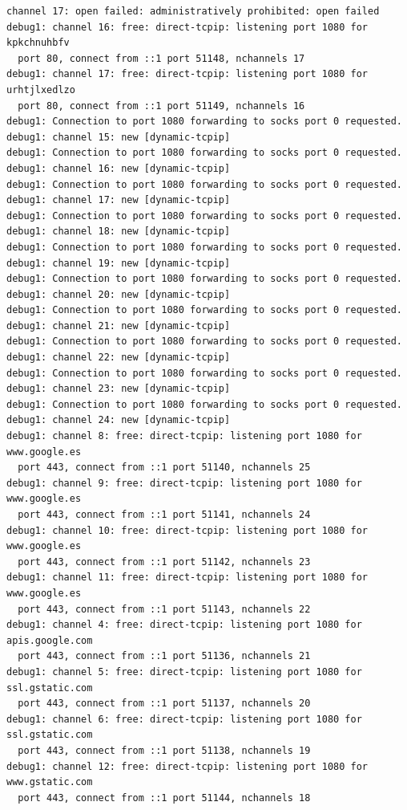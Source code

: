 \documentclass[11pt]{article}
\begin{document}
\begin{lstlisting}
channel 17: open failed: administratively prohibited: open failed
debug1: channel 16: free: direct-tcpip: listening port 1080 for kpkchnuhbfv
  port 80, connect from ::1 port 51148, nchannels 17
debug1: channel 17: free: direct-tcpip: listening port 1080 for urhtjlxedlzo
  port 80, connect from ::1 port 51149, nchannels 16
debug1: Connection to port 1080 forwarding to socks port 0 requested.
debug1: channel 15: new [dynamic-tcpip]
debug1: Connection to port 1080 forwarding to socks port 0 requested.
debug1: channel 16: new [dynamic-tcpip]
debug1: Connection to port 1080 forwarding to socks port 0 requested.
debug1: channel 17: new [dynamic-tcpip]
debug1: Connection to port 1080 forwarding to socks port 0 requested.
debug1: channel 18: new [dynamic-tcpip]
debug1: Connection to port 1080 forwarding to socks port 0 requested.
debug1: channel 19: new [dynamic-tcpip]
debug1: Connection to port 1080 forwarding to socks port 0 requested.
debug1: channel 20: new [dynamic-tcpip]
debug1: Connection to port 1080 forwarding to socks port 0 requested.
debug1: channel 21: new [dynamic-tcpip]
debug1: Connection to port 1080 forwarding to socks port 0 requested.
debug1: channel 22: new [dynamic-tcpip]
debug1: Connection to port 1080 forwarding to socks port 0 requested.
debug1: channel 23: new [dynamic-tcpip]
debug1: Connection to port 1080 forwarding to socks port 0 requested.
debug1: channel 24: new [dynamic-tcpip]
debug1: channel 8: free: direct-tcpip: listening port 1080 for www.google.es
  port 443, connect from ::1 port 51140, nchannels 25
debug1: channel 9: free: direct-tcpip: listening port 1080 for www.google.es
  port 443, connect from ::1 port 51141, nchannels 24
debug1: channel 10: free: direct-tcpip: listening port 1080 for www.google.es
  port 443, connect from ::1 port 51142, nchannels 23
debug1: channel 11: free: direct-tcpip: listening port 1080 for www.google.es
  port 443, connect from ::1 port 51143, nchannels 22
debug1: channel 4: free: direct-tcpip: listening port 1080 for apis.google.com
  port 443, connect from ::1 port 51136, nchannels 21
debug1: channel 5: free: direct-tcpip: listening port 1080 for ssl.gstatic.com
  port 443, connect from ::1 port 51137, nchannels 20
debug1: channel 6: free: direct-tcpip: listening port 1080 for ssl.gstatic.com
  port 443, connect from ::1 port 51138, nchannels 19
debug1: channel 12: free: direct-tcpip: listening port 1080 for www.gstatic.com
  port 443, connect from ::1 port 51144, nchannels 18
\end{lstlisting}
\end{document}
